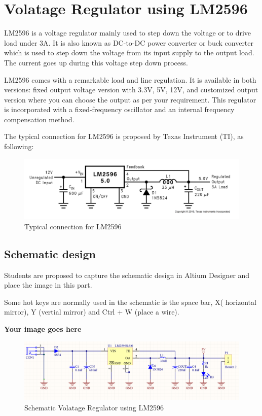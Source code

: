 \section{Volatage Regulator using LM2596}
LM2596 is a voltage regulator mainly used to step down the voltage or to drive load under
3A. It is also known as DC-to-DC power converter or buck converter which is used to step
down the voltage from its input supply to the output load. The current goes up during this
voltage step down process.

LM2596 comes with a remarkable load and line regulation. It is available in both versions:
fixed output voltage version with 3.3V, 5V, 12V, and customized output version where you
can choose the output as per your requirement. This regulator is incorporated with a
fixed-frequency oscillator and an internal frequency compensation method.

The typical connection for LM2596 is proposed by Texas Instrument (TI), as following:

\begin{figure}[ht]
    \centering
    \includegraphics[scale=0.25]{graphics/ex2/f1.png}
    \caption{Typical connection for LM2596}
\end{figure}

\subsection{Schematic design}
Students are proposed to capture the schematic design in Altium Designer and place the
image in this part.

Some hot keys are normally used in the schematic is the space bar, X( horizontal mirror),
Y (vertial mirror) and Ctrl + W (place a wire).

\pagebreak

\textbf{Your image goes here}

\begin{figure}[ht]
    \centering
    \includegraphics[scale=0.26]{graphics/ex2/f3.png}
    \caption{Schematic Volatage Regulator using LM2596}
\end{figure}

